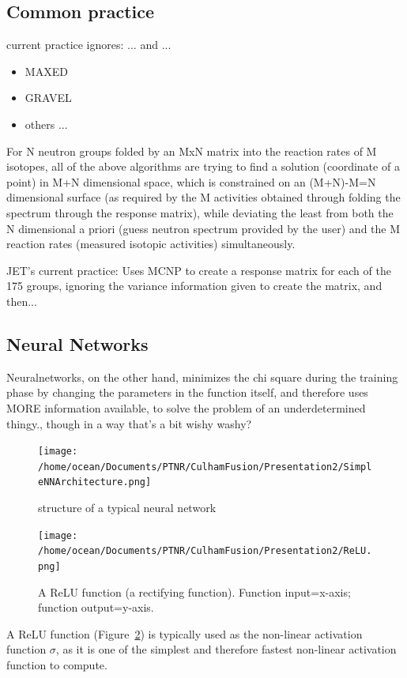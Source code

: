 \documentclass[a4paper, 12pt]{article}
\begin{document}
	\subsection{Common practice}
    current practice ignores: ... and ...
    \begin{itemize}
        \item MAXED
        \item GRAVEL
        \item others ...
    \end{itemize}
    For N neutron groups folded by an MxN matrix into the reaction rates of M isotopes,
    all of the above algorithms are trying to find a solution (coordinate of a point) in M+N dimensional space, 
    which is constrained on an (M+N)-M=N dimensional surface (as required by the M activities obtained through folding the spectrum through the response matrix),
    while deviating the least from both the N dimensional a priori (guess neutron spectrum provided by the user) and the M reaction rates (measured isotopic activities) simultaneously.
    
    JET's current practice:
    Uses MCNP to create a response matrix for each of the 175 groups, ignoring the variance information given to create the matrix, and then...

    \subsection{Neural Networks} \label{Neural Network Theory}
    Neuralnetworks, on the other hand, minimizes the chi square during the training phase by changing the parameters in the function itself, and therefore uses MORE information available, to solve the problem of an underdetermined thingy., though in a way that's a bit wishy washy?
    
    \begin{figure}
    \centering
    \texttt{[image: /home/ocean/Documents/PTNR/CulhamFusion/Presentation2/SimpleNNArchitecture.png]}
    \caption{structure of a typical neural network} \label{SimpleNNArchitecture}
    \end{figure}

    \begin{figure}
    \centering
    \texttt{[image: /home/ocean/Documents/PTNR/CulhamFusion/Presentation2/ReLU.png]}
    \caption{A ReLU function (a rectifying function). Function input=x-axis; function output=y-axis.}\label{ReLU}
    \end{figure}
    A ReLU function (Figure~\ref{ReLU}) is typically used as the non-linear activation function $\sigma$, as it is one of the simplest and therefore fastest non-linear activation function to compute.
\end{document}
